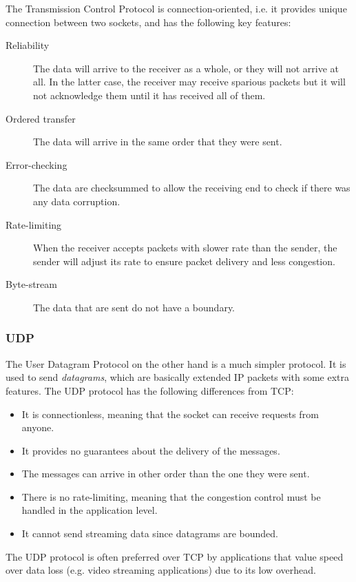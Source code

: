 The Transmission Control Protocol is connection-oriented, i.e. it provides 
unique connection between two sockets, and has the following key features:

\begin{description}
	\item[Reliability] The data will arrive to the receiver as a whole, or 
		they will not arrive at all. In the latter case, the receiver 
		may receive sparious packets but it will not acknowledge them 
		until it has received all of them.
	\item[Ordered transfer] The data will arrive in the same order that 
		they were sent.
	\item[Error-checking] The data are checksummed to allow the receiving 
		end to check if there was any data corruption.
	\item[Rate-limiting] When the receiver accepts packets with slower rate 
		than the sender, the sender will adjust its rate to ensure 
		packet delivery and less congestion.
	\item[Byte-stream] The data that are sent do not have a boundary.
\end{description}

\subsubsection{UDP}

The User Datagram Protocol on the other hand is a much simpler protocol. It is 
used to send \textit{datagrams}, which are basically extended IP packets with 
some extra features. The UDP protocol has the following differences from 
TCP:

\begin{itemize}
	\item It is connectionless, meaning that the socket can receive 
		requests from anyone.
	\item It provides no guarantees about the delivery of the messages.  
	\item The messages can arrive in other order than the one they were 
		sent.
	\item There is no rate-limiting, meaning that the congestion control 
		must be handled in the application level.
	\item It cannot send streaming data since datagrams are bounded.
\end{itemize}

The UDP protocol is often preferred over TCP by applications that value speed 
over data loss (e.g. video streaming applications) due to its low overhead.


